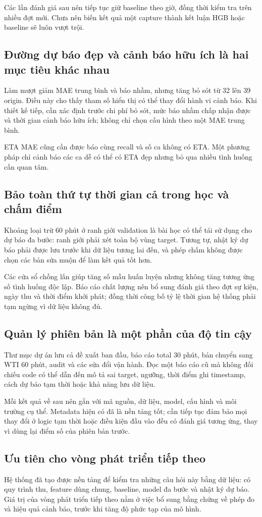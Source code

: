     Các lần đánh giá sau nên tiếp tục giữ baseline theo giờ, đồng thời kiểm tra trên nhiều đợt mới. Chưa nên biến kết quả một capture thành kết luận HGB hoặc baseline sẽ luôn vượt trội.

    \subsection{Đường dự báo đẹp và cảnh báo hữu ích là hai mục tiêu khác nhau}
    Làm mượt giảm MAE trung bình và báo nhầm, nhưng tăng bỏ sót từ 32 lên 39 origin. Điều này cho thấy tham số hiển thị có thể thay đổi hành vi cảnh báo. Khi thiết kế tiếp, cần xác định trước chi phí bỏ sót, mức báo nhầm chấp nhận được và thời gian cảnh báo hữu ích; không chỉ chọn cấu hình theo một MAE trung bình.

    ETA MAE cũng cần được báo cùng recall và số ca không có ETA. Một phương pháp chỉ cảnh báo các ca dễ có thể có ETA đẹp nhưng bỏ qua nhiều tình huống cần quan tâm.

    \subsection{Bảo toàn thứ tự thời gian cả trong học và chấm điểm}
    Khoảng loại trừ 60 phút ở ranh giới validation là bài học có thể tái sử dụng cho dự báo đa bước: ranh giới phải xét toàn bộ vùng target. Tương tự, nhật ký dự báo phải được lưu trước khi dữ liệu tương lai đến, và phép chấm không được chọn các bản sửa muộn để làm kết quả tốt hơn.

    Các cửa sổ chồng lấn giúp tăng số mẫu huấn luyện nhưng không tăng tương ứng số tình huống độc lập. Báo cáo chất lượng nên bổ sung đánh giá theo đợt sự kiện, ngày thu và thời điểm khởi phát; đồng thời công bố tỷ lệ thời gian hệ thống phải tạm ngừng vì dữ liệu không đủ.

    \subsection{Quản lý phiên bản là một phần của độ tin cậy}
    Thư mục dự án lưu cả đề xuất ban đầu, báo cáo total 30 phút, bản chuyển sang WTI 60 phút, audit và các sửa đổi vận hành. Đọc một báo cáo cũ mà không đối chiếu code có thể dẫn đến mô tả sai target, ngưỡng, thời điểm ghi timestamp, cách dự báo tạm thời hoặc khả năng lưu dữ liệu.

    Mỗi kết quả về sau nên gắn với mã nguồn, dữ liệu, model, cấu hình và môi trường cụ thể. Metadata hiện có đã là nền tảng tốt; cần tiếp tục đảm bảo mọi thay đổi ở logic tạm thời hoặc điều kiện đầu vào đều có đánh giá tương ứng, thay vì dùng lại điểm số của phiên bản trước.

    \subsection{Ưu tiên cho vòng phát triển tiếp theo}

    

    Hệ thống đã tạo được nền tảng để kiểm tra những câu hỏi này bằng dữ liệu: có quy trình thu, feature dùng chung, baseline, model đa bước và nhật ký dự báo. Giá trị của vòng phát triển tiếp theo nằm ở việc bổ sung bằng chứng về phép đo và hiệu quả cảnh báo, trước khi tăng độ phức tạp của mô hình.

